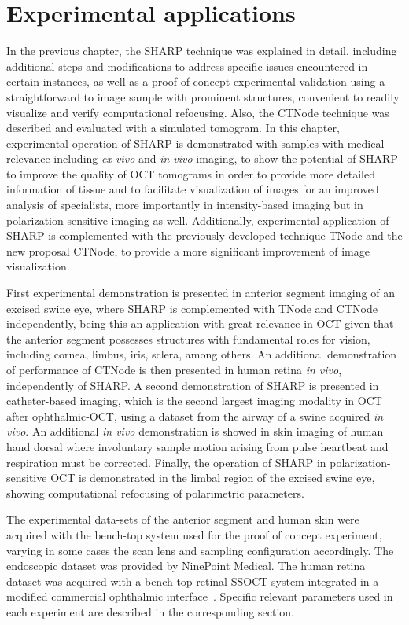 \newpage
{}
\chapter{Experimental applications}\label{chap:results}

In the previous chapter, the SHARP technique was explained in detail, including additional steps and modifications to address specific issues encountered in certain instances, as well as a proof of concept experimental validation using a straightforward to image sample with prominent structures, convenient to readily visualize and verify computational refocusing. Also, the CTNode technique was described and evaluated with a simulated tomogram.  In this chapter, experimental operation of SHARP is demonstrated with samples with medical relevance including \textit{ex vivo} and \textit{in vivo} imaging, to show the potential of SHARP to improve the quality of OCT tomograms in order to provide more detailed information of tissue and to facilitate visualization of images for an improved analysis of specialists, more importantly in intensity-based imaging but in polarization-sensitive imaging as well. Additionally, experimental application of SHARP is complemented with the previously developed technique TNode and the new proposal CTNode, to provide a more significant improvement of image visualization.

First experimental demonstration is presented in anterior segment imaging of an excised swine eye, where SHARP is complemented with TNode and CTNode independently, being this an application with great relevance in OCT given that the anterior segment possesses structures with fundamental roles for vision, including cornea, limbus, iris, sclera, among others. An additional demonstration of performance of CTNode is then presented in human retina \textit{in vivo}, independently of SHARP.  A second demonstration of SHARP is presented in catheter-based imaging, which is the second largest imaging modality in OCT after ophthalmic-OCT, using a dataset from the airway of a swine acquired \textit{in vivo}. An additional \textit{in vivo} demonstration is showed in skin imaging of human hand dorsal where involuntary sample motion arising from pulse heartbeat and respiration must be corrected. Finally, the operation of SHARP in polarization-sensitive OCT is demonstrated in the limbal region of the excised swine eye, showing computational refocusing of polarimetric parameters.

The experimental data-sets of the anterior segment and human skin were acquired with the bench-top system used for the proof of concept experiment, varying in some cases the scan lens and sampling configuration accordingly. The endoscopic dataset was provided by NinePoint Medical. The human retina dataset was acquired with a bench-top retinal SSOCT system integrated in a modified commercial ophthalmic interface~\cite{Braaf2018_Complex}. Specific relevant parameters used in each experiment are described in the corresponding section.

